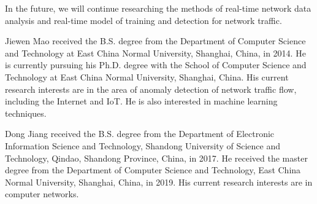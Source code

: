 \documentclass{ieeeaccess}
\theoremstyle{definition}
\begin{document}
In the future, we will continue researching the methods of real-time network data analysis and real-time model of training and detection for network traffic.


{}


\begin{IEEEbiography}{Jiewen Mao}
    received the B.S. degree from the Department of Computer Science and Technology at East China Normal University, Shanghai, China, in 2014. He is currently pursuing his Ph.D. degree with the School of Computer Science and Technology at East China Normal University, Shanghai, China. His current research interests are in the area of anomaly detection of network traffic flow, including the Internet and IoT. He is also interested in machine learning techniques.
\end{IEEEbiography}

\begin{IEEEbiography}{Dong Jiang}
    received the B.S. degree from the Department of Electronic Information Science and Technology, Shandong University of Science and Technology, Qindao, Shandong Province, China, in 2017. He received the master degree from the Department of Computer Science and Technology, East China Normal University, Shanghai, China, in 2019. His current research interests are in computer networks.
\end{IEEEbiography}
\end{document}
